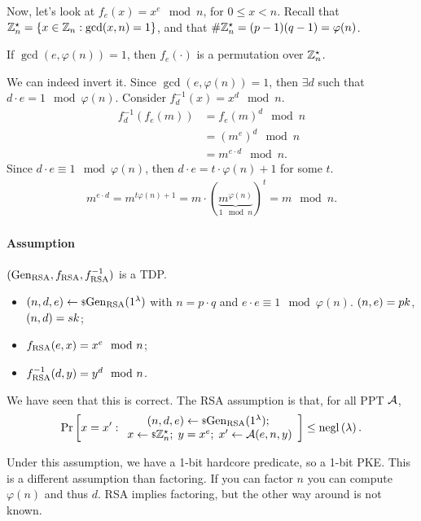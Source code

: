 Now, let's look at $f_e(x) = x^e \mod n$, for $0 \le x < n$.
Recall that $\mathbb{Z}_n^{\star} = \{ x \in \mathbb{Z}_n : \gcd(x, n) = 1 \}$, and that $\# \mathbb{Z}_n^{\star} = (p-1)(q-1) = \varphi(n)$.
\begin{fact}
	If $\gcd(e, \varphi(n)) = 1$, then $f_e(\cdot)$ is a permutation over $\mathbb{Z}_n^{\star}$.
\end{fact}
We can indeed invert it.
Since $\gcd(e, \varphi(n)) = 1$, then $\exists d$ such that $d \cdot e = 1 \mod \varphi(n)$.
Consider $f_d^{-1}(x) = x^d \mod n$.
\begin{align*}
	f_d^{-1} \left( f_e(m) \right)
	& = {f_e(m)}^d \mod n \\
	& = \left(m^e\right)^d \mod n \\
	& = m^{e \cdot d} \mod n.
\end{align*}
Since $d \cdot e \equiv 1 \mod \varphi(n)$, then $d \cdot e = t \cdot \varphi(n) + 1$ for some $t$.
\begin{align*}
	m^{e \cdot d} =
	m^{t \varphi(n) + 1} = m \cdot (\underbrace{m^{\varphi(n)}}_{1 \mod n})^t = m \mod n.
\end{align*}

\paragraph{Assumption} $(\mathrm{Gen}_{\mathrm{RSA}}, f_{\mathrm{RSA}}, f_{\mathrm{RSA}}^{-1})$ is a \ac{TDP}.
\begin{itemize}
	\item $(n,d,e) \leftarrow {\scriptstyle \$} {\mathrm{Gen}_{\mathrm{RSA}}(1^{\lambda})}$ with $n = p \cdot q$ and $e \cdot e \equiv 1 \mod \varphi(n)$.
		$(n,e) = pk$, $(n,d) = sk$;
	\item $f_{\mathrm{RSA}}(e,x) = x^e \mod n$;
	\item $f_{\mathrm{RSA}}^{-1}(d,y) = y^d \mod n$.
\end{itemize}
We have seen that this is correct.
The \ac{RSA} assumption is that, for all \ac{PPT} $\mathcal{A}$,
\begin{equation*}
	\mathop{\mathrm{Pr}}\limits_{} \left[ {
		x = x' :
		\begin{array}{c}
		(n,d,e) \leftarrow {\scriptstyle \$} {\mathrm{Gen}_{\mathrm{RSA}}(1^{\lambda})}; \;
		\\
		x \leftarrow {\scriptstyle \$} {\mathbb{Z}_n^{\star}}; \;
		y = x^e; \;
		x' \leftarrow \mathcal{A}(e, n, y)
		\end{array}
	} \right]
	\le \mathrm{negl}\left({\lambda}\right).
\end{equation*}

Under this assumption, we have a 1-bit hardcore predicate, so a 1-bit \ac{PKE}.
This is a different assumption than factoring.
If you can factor $n$ you can compute $\varphi(n)$ and thus $d$.
\ac{RSA} implies factoring, but the other way around is not known.

